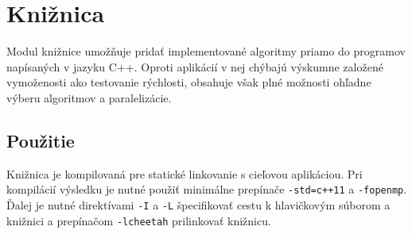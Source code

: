 \documentclass[a4paper, 12pt, slovak]{article}
\begin{document}
\section{Knižnica}
Modul knižnice umožňuje pridať implementované algoritmy priamo do programov 
napísaných v jazyku C++. Oproti aplikácií v nej chýbajú výskumne založené 
vymoženosti ako testovanie rýchlosti, obsahuje však plné možnosti ohľadne výberu 
algoritmov a paralelizácie.

\subsection{Použitie}
Knižnica je kompilovaná pre statické linkovanie s cieľovou aplikáciou. Pri 
kompilácií výsledku je nutné použiť minimálne prepínače \texttt{-std=c++11} a 
\texttt{-fopenmp}. Ďalej je nutné direktívami \texttt{-I} a \texttt{-L} špecifikovať 
cestu k hlavičkovým súborom a knižnici a prepínačom \texttt{-lcheetah} prilinkovať 
knižnicu.
\end{document}
